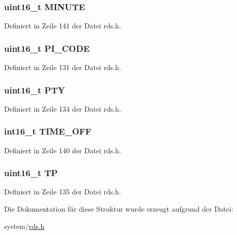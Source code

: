 \subsubsection[{M\+I\+N\+U\+T\+E}]{\setlength{\rightskip}{0pt plus 5cm}uint16\+\_\+t M\+I\+N\+U\+T\+E}\label{structgroup__4a_a4377c294f04582b75e2fcd4134fdeb46}


Definiert in Zeile 141 der Datei rds.\+h.

\hypertarget{structgroup__4a_a5cd9b1f6413028425796c1129aa8fd87}{}
\subsubsection[{P\+I\+\_\+\+C\+O\+D\+E}]{\setlength{\rightskip}{0pt plus 5cm}uint16\+\_\+t P\+I\+\_\+\+C\+O\+D\+E}\label{structgroup__4a_a5cd9b1f6413028425796c1129aa8fd87}


Definiert in Zeile 131 der Datei rds.\+h.

\hypertarget{structgroup__4a_a0474967478fbbc2c71b800d2e0132d45}{}
\subsubsection[{P\+T\+Y}]{\setlength{\rightskip}{0pt plus 5cm}uint16\+\_\+t P\+T\+Y}\label{structgroup__4a_a0474967478fbbc2c71b800d2e0132d45}


Definiert in Zeile 134 der Datei rds.\+h.

\hypertarget{structgroup__4a_ad17cf07501152f576f64d6bf9d06b453}{}
\subsubsection[{T\+I\+M\+E\+\_\+\+O\+F\+F}]{\setlength{\rightskip}{0pt plus 5cm}int16\+\_\+t T\+I\+M\+E\+\_\+\+O\+F\+F}\label{structgroup__4a_ad17cf07501152f576f64d6bf9d06b453}


Definiert in Zeile 140 der Datei rds.\+h.

\hypertarget{structgroup__4a_ab9e634c63b0d95a96716d5f6d7f06d72}{}
\subsubsection[{T\+P}]{\setlength{\rightskip}{0pt plus 5cm}uint16\+\_\+t T\+P}\label{structgroup__4a_ab9e634c63b0d95a96716d5f6d7f06d72}


Definiert in Zeile 135 der Datei rds.\+h.



Die Dokumentation für diese Struktur wurde erzeugt aufgrund der Datei\+:\begin{DoxyCompactItemize}
\item 
system/\hyperlink{rds_8h}{rds.\+h}\end{DoxyCompactItemize}
